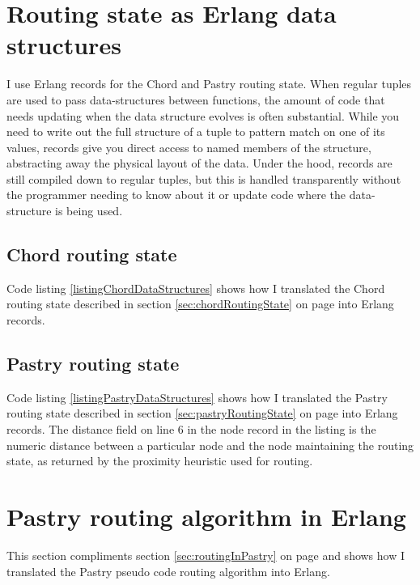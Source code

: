 \chapter{Routing state as Erlang data structures}
\label{sec:appendixErlangRoutingState}
I use Erlang records for the Chord and Pastry routing state.
When regular tuples are used to pass data-structures between functions, the amount of code that needs updating when the data structure evolves is often substantial.
While you need to write out the full structure of a tuple to pattern match on one of its values, records give you direct access to named members of the structure, abstracting away the physical layout of the data.
Under the hood, records are still compiled down to regular tuples, but this is handled transparently  without the programmer needing to know about it or update code where the data-structure is being used.

\section{Chord routing state}
Code listing \ref{listingChordDataStructures} shows how I translated the Chord routing state described in section \ref{sec:chordRoutingState} on page \pageref{sec:chordRoutingState} into Erlang records.



\section{Pastry routing state}
Code listing \ref{listingPastryDataStructures} shows how I translated the Pastry routing state described in section \ref{sec:pastryRoutingState} on page \pageref{sec:pastryRoutingState} into Erlang records.
The distance field on line 6 in the node record in the listing is the numeric distance between a particular node and the node maintaining the routing state, as returned by the proximity heuristic used for routing.



\chapter{Pastry routing algorithm in Erlang}
\label{sec:appendixErlangRoutingAlgorithm}
This section compliments section \ref{sec:routingInPastry} on page \pageref{sec:routingInPastry} and shows how I translated the Pastry pseudo code routing algorithm into Erlang.

